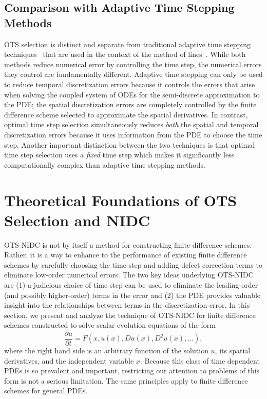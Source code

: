 \documentclass[fleqn,12pt,twoside]{article}
\newcommand{\beq}{\begin{equation}}
\newcommand{\eeq}{\end{equation}}
\begin{document}
\subsection{Comparison with Adaptive Time Stepping Methods}
OTS selection is distinct and separate from traditional adaptive time stepping 
techniques~\cite{iserles_book,shampine_2005} that are used in the 
context of the method of lines~\cite{iserles_book,gko_book}.  
While both methods reduce numerical error by controlling the time step, the 
numerical errors they control are fundamentally different.  Adaptive time 
stepping can only be used to reduce temporal discretization errors because it 
controls the errors that arise when solving the coupled system of ODEs for the 
semi-discrete approximation to the PDE; the spatial discretization errors 
are completely controlled by the finite difference scheme selected to 
approximate the spatial derivatives.  
In contrast, optimal time step selection simultaneously reduces 
\emph{both} the spatial and temporal discretization errors because it
uses information from the PDE to choose the time step.  Another important 
distinction between the two techniques is that optimal time step selection 
uses a \emph{fixed} time step which makes it significantly less 
computationally complex than adaptive time stepping methods.


\section{\label{sec:OTS-NIDC}
         Theoretical Foundations of OTS Selection and NIDC}
OTS-NIDC is not by itself a method for constructing finite difference 
schemes.  Rather, it is a way to enhance to the performance of existing 
finite difference schemes by carefully choosing the time step and adding
defect correction terms to eliminate low-order numerical errors.  
The two key ideas underlying OTS-NIDC are 
(1) a judicious choice of time step can be used to eliminate the leading-order 
(and possibly higher-order) terms in the error
and
(2) the PDE provides valuable insight into the relationships between terms
in the discretization error. 
In this section, we present and analyze the technique of OTS-NIDC for finite 
difference schemes constructed to solve scalar evolution equations of the form 
\beq
  \frac{\partial u}{\partial t} = 
    F\left(x, u(x), D u(x), D^2 u(x), \ldots \right), 
\eeq
where the right hand side is an arbitrary function of the solution $u$, its 
spatial derivatives, and the independent variable $x$.
Because this class of time dependent PDEs is so prevalent and important, 
restricting our attention to problems of this form is not a serious 
limitation.  The same principles apply to finite difference schemes for 
general PDEs.
\end{document}
